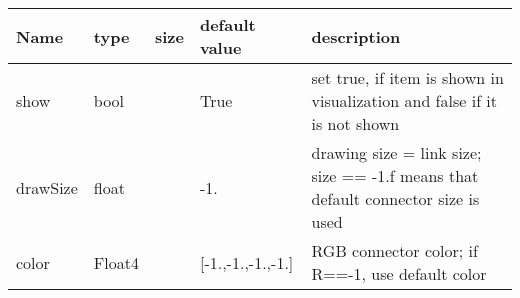 \begin{center}
  \footnotesize
  \begin{longtable}{| p{4.5cm} | p{2.5cm} | p{0.5cm} | p{2.5cm} | p{6cm} |}
    \hline
    \bf Name & \bf type & \bf size & \bf default value & \bf description \\ \hline
    show &     bool &      &     True &     set true, if item is shown in visualization and false if it is not shown\\ \hline
    drawSize &     float &      &     -1. &     drawing size = link size; size == -1.f means that default connector size is used\\ \hline
    color &     Float4 &      &     [-1.,-1.,-1.,-1.] &     RGB connector color; if R==-1, use default color\\ \hline
	  \end{longtable}
	\end{center}

